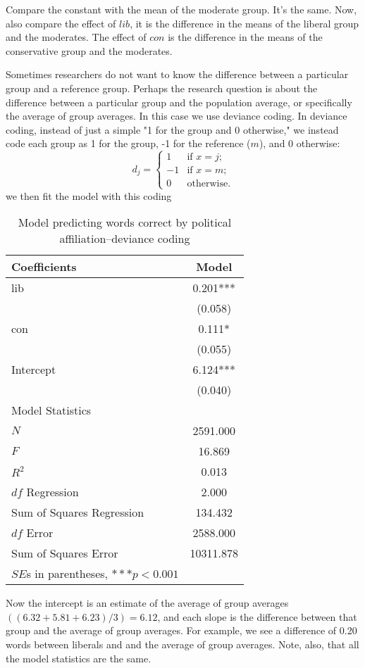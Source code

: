 Compare the constant with the mean of the moderate group. It's the same. Now, also compare the effect of $lib$, it is the difference in the means of the liberal group and the moderates. The effect of $con$ is the difference in the means of the conservative group and the moderates.

Sometimes researchers do not want to know the difference between a particular group and a reference group. Perhaps the research question is about the difference between a particular group and the population average, or specifically the average of group averages. In this case we use deviance coding. In deviance coding, instead of just a simple "1 for the group and 0 otherwise," we instead code each group as 1 for the group, -1 for the reference ($m$), and 0 otherwise:
\begin{equation}
d_j = \left\{ \begin{array}{ll}
     1 & \mbox{if $x = j$};\\
     -1 & \mbox{if $x = m$};\\
     0 & \mbox{otherwise}.\end{array} \right.
\end{equation}
we then fit the model with this coding
\begin{table}[htbp]\centering
 \caption{Model predicting words correct by political affiliation--deviance coding
\label{tab:wordreg_dc}}
\begin{tabular}{lc}
\hline
Coefficients      &    Model  \\ \hline
lib     &    0.201***\\
      &   (0.058)  \\
con     &    0.111* \\
      &   (0.055)  \\
Intercept    &    6.124***\\
      &   (0.040)  \\
\hline
\multicolumn{1}{l}{Model Statistics} \\
\hline
$N$          &   2591.000  \\
$F$          &   16.869  \\
$R^2$        &    0.013  \\
$df$ Regression      &    2.000  \\
Sum of Squares Regression     &  134.432  \\
$df$ Error    &   2588.000  \\
Sum of Squares Error    &  10311.878  \\
\hline
\multicolumn{1}{l}{$SE$s in parentheses, $***p<0.001$} \\
\hline
\end{tabular}
\end{table}
Now the intercept is an estimate of the average of group averages $((6.32 + 5.81 + 6.23)/3) = 6.12$, and each slope is the difference between that group and the average of group averages. For example, we see a difference of 0.20 words between liberals and and the average of group averages. Note, also, that all the model statistics are the same.

